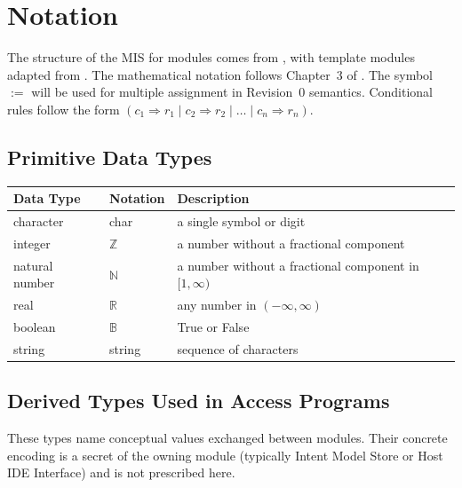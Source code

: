 \documentclass[12pt, titlepage]{article}
\begin{document}
\section{Notation}

The structure of the MIS for modules comes from \citet{HoffmanAndStrooper1995},
with template modules adapted from \citet{GhezziEtAl2003}. The mathematical
notation follows Chapter~3 of \citet{HoffmanAndStrooper1995}. The symbol
$:=$ will be used for multiple assignment in Revision~0 semantics. Conditional
rules follow the form $(c_1 \Rightarrow r_1 \mid c_2 \Rightarrow r_2 \mid
\ldots \mid c_n \Rightarrow r_n)$.

\subsection{Primitive Data Types}

\begin{center}
\renewcommand{\arraystretch}{1.2}
\begin{tabular}{l l p{7.5cm}}
\toprule
\textbf{Data Type} & \textbf{Notation} & \textbf{Description}\\
\midrule
character & char & a single symbol or digit\\
integer & $\mathbb{Z}$ & a number without a fractional component\\
natural number & $\mathbb{N}$ & a number without a fractional component in
$[1, \infty)$\\
real & $\mathbb{R}$ & any number in $(-\infty, \infty)$\\
boolean & $\mathbb{B}$ & True or False\\
string & string & sequence of characters\\
\bottomrule
\end{tabular}
\end{center}

\subsection{Derived Types Used in Access Programs}

These types name conceptual values exchanged between modules. Their concrete
encoding is a secret of the owning module (typically Intent Model Store or Host
IDE Interface) and is not prescribed here.
\end{document}
